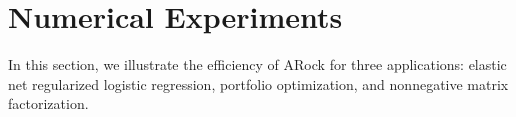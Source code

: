 \section{Numerical Experiments}
In this section, we illustrate the efficiency of ARock for three applications: elastic net regularized logistic regression, portfolio optimization,  and nonnegative matrix factorization.




